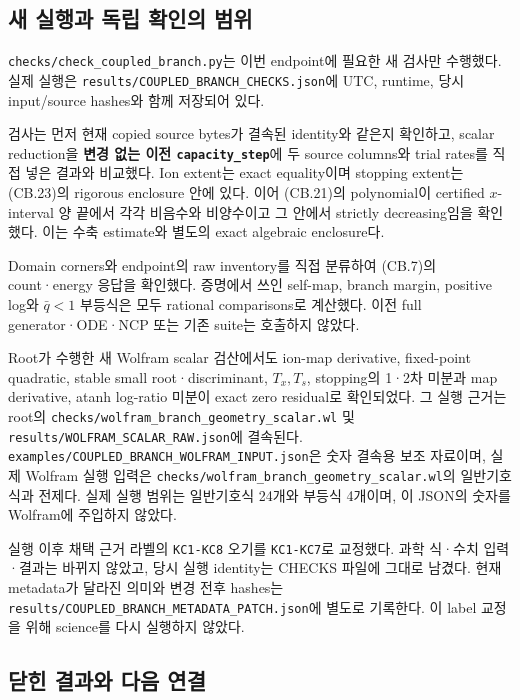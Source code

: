 \documentclass[11pt,a4paper]{article}
\begin{document}
\hypertarget{uxc0c8-uxc2e4uxd589uxacfc-uxb3c5uxb9bd-uxd655uxc778uxc758-uxbc94uxc704}{%
\subsection{새 실행과 독립 확인의 범위}\label{uxc0c8-uxc2e4uxd589uxacfc-uxb3c5uxb9bd-uxd655uxc778uxc758-uxbc94uxc704}}

\nolinkurl{checks/check_coupled_branch.py}는 이번 endpoint에 필요한 새 검사만 수행했다. 실제 실행은 \nolinkurl{results/COUPLED_BRANCH_CHECKS.json}에 UTC, runtime, 당시 input/source hashes와 함께 저장되어 있다.

검사는 먼저 현재 copied source bytes가 결속된 identity와 같은지 확인하고, scalar reduction을 \textbf{변경 없는 이전 \texttt{capacity\_step}}에 두 source columns와 trial rates를 직접 넣은 결과와 비교했다. Ion extent는 exact equality이며 stopping extent는 (CB.23)의 rigorous enclosure 안에 있다. 이어 (CB.21)의 polynomial이 certified \(x\)-interval 양 끝에서 각각 비음수와 비양수이고 그 안에서 strictly decreasing임을 확인했다. 이는 수축 estimate와 별도의 exact algebraic enclosure다.

Domain corners와 endpoint의 raw inventory를 직접 분류하여 (CB.7)의 count·energy 응답을 확인했다. 증명에서 쓰인 self-map, branch margin, positive log와 \(\bar q<1\) 부등식은 모두 rational comparisons로 계산했다. 이전 full generator·ODE·NCP 또는 기존 suite는 호출하지 않았다.

Root가 수행한 새 Wolfram scalar 검산에서도 ion-map derivative, fixed-point quadratic, stable small root·discriminant, \(T_x,T_s\), stopping의 1·2차 미분과 map derivative, atanh log-ratio 미분이 exact zero residual로 확인되었다. 그 실행 근거는 root의 \nolinkurl{checks/wolfram_branch_geometry_scalar.wl} 및 \nolinkurl{results/WOLFRAM_SCALAR_RAW.json}에 결속된다. \nolinkurl{examples/COUPLED_BRANCH_WOLFRAM_INPUT.json}은 숫자 결속용 보조 자료이며, 실제 Wolfram 실행 입력은 \nolinkurl{checks/wolfram_branch_geometry_scalar.wl}의 일반기호식과 전제다. 실제 실행 범위는 일반기호식 24개와 부등식 4개이며, 이 JSON의 숫자를 Wolfram에 주입하지 않았다.

실행 이후 채택 근거 라벨의 \texttt{KC1-KC8} 오기를 \texttt{KC1-KC7}로 교정했다. 과학 식·수치 입력·결과는 바뀌지 않았고, 당시 실행 identity는 CHECKS 파일에 그대로 남겼다. 현재 metadata가 달라진 의미와 변경 전후 hashes는 \texttt{results/COUPLED\_BRANCH\_METADATA\_PATCH.json}에 별도로 기록한다. 이 label 교정을 위해 science를 다시 실행하지 않았다.

\hypertarget{uxb2ebuxd78c-uxacb0uxacfcuxc640-uxb2e4uxc74c-uxc5f0uxacb0}{%
\subsection{닫힌 결과와 다음 연결}\label{uxb2ebuxd78c-uxacb0uxacfcuxc640-uxb2e4uxc74c-uxc5f0uxacb0}}
\end{document}
